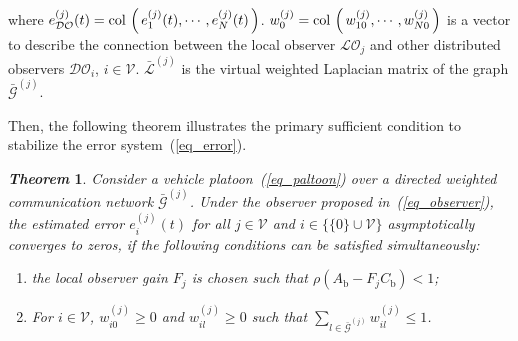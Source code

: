 \documentclass[letterpaper, 10pt, conference]{ieeeconf}  %
\def\col#1{\mathop{{\rm col}\,\left(\,#1\,\right)}}
\def\eqref#1{(\ref{#1})}
\def\V{\mathcal{V}} %
\def\G{\mathcal{G}} %
\def\W{\mathcal{W}} %
\def\L{\mathcal{L}} %
\def\LO{\mathcal{LO}} %
\def\DO{\mathcal{DO}} %
\def\diag#1{\mathop{{\rm diag}\,\left(\,#1\,\right)}}
\newtheorem{theorem}{\it Theorem}%
\begin{document}
 where $e_{\DO}^{(j)}(t) = \col{e_1^{(j)}(t), \cdots , e_N^{(j)}(t)}$. $w_{0}^{(j)} = \col{w_{10}^{(j)}, \cdots, w_{N0}^{(j)}} $ is a vector to describe the connection between the local observer $\LO_{j}$ and other distributed observers $\DO_{i}$, $i \in \V$. 
$\bar{\L}^{(j)}$ is the virtual weighted Laplacian matrix of the graph $\bar{\G}^{(j)}$. 


Then, the following theorem illustrates the primary sufficient condition to stabilize the error system~\eqref{eq_error}. 
\begin{theorem}\label{thm_observer}
Consider a vehicle platoon~\eqref{eq_paltoon} over a directed weighted communication network $\bar{\G}^{(j)}$. Under the observer proposed in~\eqref{eq_observer}, the estimated error $e_{i}^{(j)}(t)$ for all $j \in  \V$ and $i \in \{\{ 0 \} \cup \V\}$ asymptotically converges to zeros, if the following conditions can be satisfied simultaneously:
\begin{enumerate}
    \item the local observer gain $F_{j}$ is chosen such that $\rho \left( A_{\text{b}} - F_{j}C_{\text{b}} \right) < 1$;\label{thm_Fj}
    \item For $i \in \V$, $w_{i0}^{(j)} \geq 0$ and $w_{il}^{(j)} \geq 0$ such that $\sum_{l\in \bar{\G}^{(j)}} w_{il}^{(j)} \leq 1$.\label{thm_W} 
\end{enumerate}
\end{theorem}
\end{document}
